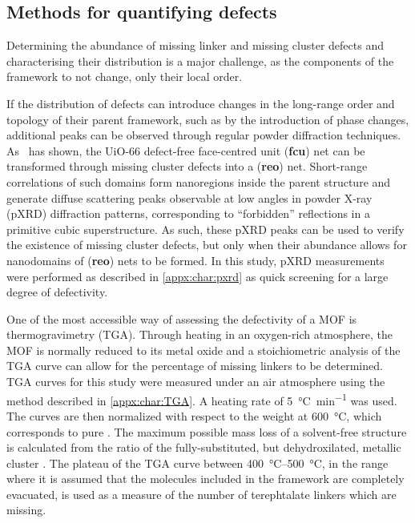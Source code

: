 \subsection{Methods for quantifying defects}

Determining the abundance of missing linker and missing cluster 
defects and characterising their distribution is a major challenge,
as the components of the framework to not change, only their local
order.

If the distribution of defects can introduce changes in the
long-range order and topology of their parent framework,
such as by the introduction of phase changes,
additional peaks can be observed through regular
powder diffraction techniques.
As~\citet{cliffeCorrelatedDefectNanoregions2014} has shown,
the UiO-66 defect-free face-centred unit (\textbf{fcu})
net can be transformed through missing cluster defects into
a (\textbf{reo}) net. Short-range correlations of such domains
form nanoregions inside the parent structure and generate
diffuse scattering peaks observable at low angles in
powder X-ray (pXRD) diffraction patterns, corresponding to ``forbidden''
reflections in a primitive cubic superstructure.
As such, these pXRD peaks can be used to verify the existence of
missing cluster defects, but only when their abundance allows for
nanodomains of (\textbf{reo}) nets to be formed. In this study,
pXRD measurements were performed as described in \autoref{appx:char:pxrd}
as quick screening for a large degree of defectivity.

One of the most accessible way of assessing the defectivity of
a MOF is thermogravimetry (TGA). Through heating in
an oxygen-rich atmosphere, the MOF is normally reduced to
its metal oxide and a stoichiometric analysis of the TGA curve
can allow for the percentage of missing linkers to be
determined. TGA curves for this study were measured under
an air atmosphere using the method described in \autoref{appx:char:TGA}.
A heating rate of \SI{5}{\degreeCelsius\per\minute} was used.
The curves are then normalized with respect to the weight at
\SI{600}{\degreeCelsius}, which corresponds to pure
. The maximum possible mass loss of a solvent-free
structure is calculated from the ratio of the fully-substituted,
but dehydroxilated, metallic cluster . The plateau
of the TGA curve between \SIrange{400}{500}{\degreeCelsius},
in the range where it is assumed that the molecules included in
the framework are completely evacuated, is used as a measure of the
number of terephtalate linkers which are missing.

